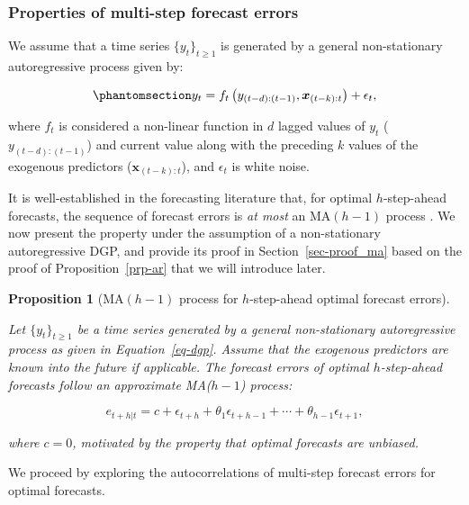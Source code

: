 \documentclass[
  11pt,
  a4paper,
]{article}
\theoremstyle{plain}
\newtheorem{proposition}{Proposition}[section]
\theoremstyle{plain}
\theoremstyle{remark}
\begin{document}
\subsubsection{Properties of multi-step forecast errors}\label{sec-ppt}

We assume that a time series \(\{y_t\}_{t \geq 1}\) is generated by a
general non-stationary autoregressive process given by:

\begin{equation}\phantomsection\label{eq-dgp}{
y_t = f_{t}\left(y_{(t-d):(t-1)},\bm{x}_{(t-k):t}\right) + \epsilon_t,
}\end{equation}

where \(f_{t}\) is considered a non-linear function in \(d\) lagged
values of \(y_t\) (\(y_{(t-d):(t-1)}\)) and current value along with the
preceding \(k\) values of the exogenous predictors
(\(\bm{x}_{(t-k):t}\)), and \(\epsilon_t\) is white noise.

It is well-established in the forecasting literature that, for optimal
\(h\)-step-ahead forecasts, the sequence of forecast errors is \emph{at
most} an MA\((h-1)\) process \autocite{harvey1997,diebold2017}. We now
present the property under the assumption of a non-stationary
autoregressive DGP, and provide its proof in Section~\ref{sec-proof_ma}
based on the proof of Proposition~\ref{prp-ar} that we will introduce
later.

\begin{proposition}[MA\((h-1)\) process for \(h\)-step-ahead optimal
forecast errors]\protect\hypertarget{prp-ma}{}\label{prp-ma}

Let \(\{y_t\}_{t \geq 1}\) be a time series generated by a general
non-stationary autoregressive process as given in Equation~\ref{eq-dgp}.
Assume that the exogenous predictors are known into the future if
applicable. The forecast errors of optimal \(h\)-step-ahead forecasts
follow an approximate MA(\(h-1\)) process:

\[
e_{t+h|t} = c + \epsilon_{t+h} + \theta_1\epsilon_{t+h-1} + \cdots + \theta_{h-1}\epsilon_{t+1},
\]

where \(c=0\), motivated by the property that optimal forecasts are
unbiased.

\end{proposition}

We proceed by exploring the autocorrelations of multi-step forecast
errors for optimal forecasts.
\end{document}

